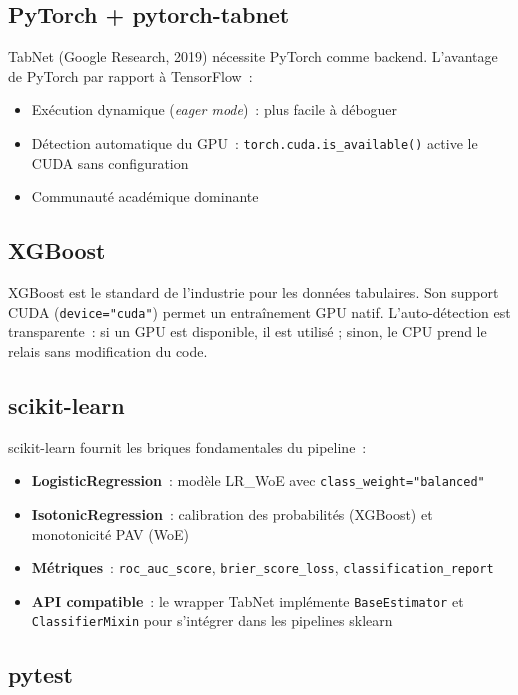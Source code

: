 \documentclass[12pt,a4paper]{article}
\begin{document}
\subsection{PyTorch + pytorch-tabnet}

TabNet (Google Research, 2019) n\'ecessite PyTorch comme backend. L'avantage de PyTorch par rapport \`a TensorFlow~:
\begin{itemize}[noitemsep]
    \item Ex\'ecution dynamique (\textit{eager mode})~: plus facile \`a d\'eboguer
    \item D\'etection automatique du GPU~: \texttt{torch.cuda.is\_available()} active le CUDA sans configuration
    \item Communaut\'e acad\'emique dominante
\end{itemize}

\subsection{XGBoost}

XGBoost est le standard de l'industrie pour les donn\'ees tabulaires. Son support CUDA (\texttt{device="cuda"}) permet un entra\^inement GPU natif. L'auto-d\'etection est transparente~: si un GPU est disponible, il est utilis\'e ; sinon, le CPU prend le relais sans modification du code.

\subsection{scikit-learn}

scikit-learn fournit les briques fondamentales du pipeline~:
\begin{itemize}[noitemsep]
    \item \textbf{LogisticRegression}~: mod\`ele LR\_WoE avec \texttt{class\_weight="balanced"}
    \item \textbf{IsotonicRegression}~: calibration des probabilit\'es (XGBoost) et monotonicit\'e PAV (WoE)
    \item \textbf{M\'etriques}~: \texttt{roc\_auc\_score}, \texttt{brier\_score\_loss}, \texttt{classification\_report}
    \item \textbf{API compatible}~: le wrapper TabNet impl\'emente \texttt{BaseEstimator} et \texttt{ClassifierMixin} pour s'int\'egrer dans les pipelines sklearn
\end{itemize}

\subsection{pytest}
\end{document}
